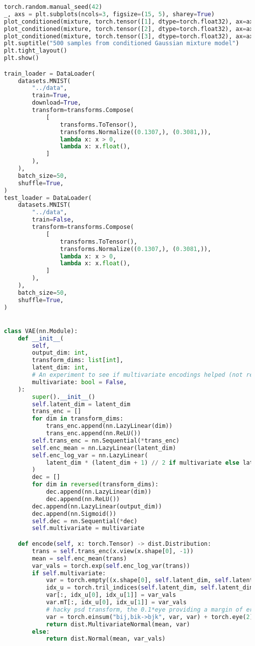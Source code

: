 \documentclass[11pt]{article} %
\begin{document}
\begin{lstlisting}[language=Python]
torch.random.manual_seed(42)
_, axs = plt.subplots(ncols=3, figsize=(15, 5), sharey=True)
plot_conditioned(mixture, torch.tensor([1], dtype=torch.float32), ax=axs[0])
plot_conditioned(mixture, torch.tensor([2], dtype=torch.float32), ax=axs[1])
plot_conditioned(mixture, torch.tensor([3], dtype=torch.float32), ax=axs[2])
plt.suptitle("500 samples from conditioned Gaussian mixture model")
plt.tight_layout()
plt.show()

train_loader = DataLoader(
    datasets.MNIST(
        "../data",
        train=True,
        download=True,
        transform=transforms.Compose(
            [
                transforms.ToTensor(),
                transforms.Normalize((0.1307,), (0.3081,)),
                lambda x: x > 0,
                lambda x: x.float(),
            ]
        ),
    ),
    batch_size=50,
    shuffle=True,
)
test_loader = DataLoader(
    datasets.MNIST(
        "../data",
        train=False,
        transform=transforms.Compose(
            [
                transforms.ToTensor(),
                transforms.Normalize((0.1307,), (0.3081,)),
                lambda x: x > 0,
                lambda x: x.float(),
            ]
        ),
    ),
    batch_size=50,
    shuffle=True,
)


class VAE(nn.Module):
    def __init__(
        self,
        output_dim: int,
        transform_dims: list[int],
        latent_dim: int,
        # An experiment to see if multivariate encodings helped (not really)
        multivariate: bool = False,
    ):
        super().__init__()
        self.latent_dim = latent_dim
        trans_enc = []
        for dim in transform_dims:
            trans_enc.append(nn.LazyLinear(dim))
            trans_enc.append(nn.ReLU())
        self.trans_enc = nn.Sequential(*trans_enc)
        self.enc_mean = nn.LazyLinear(latent_dim)
        self.enc_log_var = nn.LazyLinear(
            latent_dim * (latent_dim + 1) // 2 if multivariate else latent_dim
        )
        dec = []
        for dim in reversed(transform_dims):
            dec.append(nn.LazyLinear(dim))
            dec.append(nn.ReLU())
        dec.append(nn.LazyLinear(output_dim))
        dec.append(nn.Sigmoid())
        self.dec = nn.Sequential(*dec)
        self.multivariate = multivariate

    def encode(self, x: torch.Tensor) -> dist.Distribution:
        trans = self.trans_enc(x.view(x.shape[0], -1))
        mean = self.enc_mean(trans)
        var_vals = torch.exp(self.enc_log_var(trans))
        if self.multivariate:
            var = torch.empty((x.shape[0], self.latent_dim, self.latent_dim))
            idx_u = torch.tril_indices(self.latent_dim, self.latent_dim)
            var[:, idx_u[0], idx_u[1]] = var_vals
            var.mT[:, idx_u[0], idx_u[1]] = var_vals
            # hacky psd transform, the 0.1*eye providing a margin of error
            var = torch.einsum("bij,bik->bjk", var, var) + torch.eye(2) * 0.1
            return dist.MultivariateNormal(mean, var)
        else:
            return dist.Normal(mean, var_vals)


\end{lstlisting}
\end{document}
